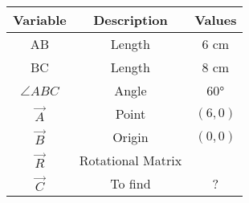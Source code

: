 
\begin{tabular}[12pt]{ |c| c| c|}
    \hline
    \textbf{Variable} & \textbf{Description} & \textbf{Values} \\ 
    \hline
    AB & Length & 6 cm \\
    \hline
    BC & Length & 8 cm \\
    \hline
    $\angle ABC$ & Angle & \ang{60}\\
    \hline 
    $\vec{A}$ & Point & $(6,0)$ \\
    \hline
    $\vec{B}$ & Origin & $(0,0)$ \\
    \hline
     $\vec{R}$ & Rotational Matrix &  \\
    \hline
    $\vec{C}$ & To find & ? \\
    \hline
    \end{tabular}

